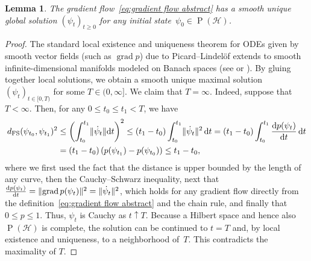 \documentclass[11pt,a4paper]{article}
\newtheorem{lemma}[theorem]{Lemma}\AddToHook{env/lemma/begin}{\crefalias{theorem}{lemma}}
\numberwithin{equation}{section}
\newcommand{\dd}{\textrm{d}}
\newcommand{\HH}{\mathcal{H}}
\newcommand{\1}{\mathbf{1}}
\let\oldS\S
\renewcommand{\S}{\operatorname{S}}
\renewcommand{\P}{\operatorname{P}}
\DeclareMathOperator{\grad}{grad}
\DeclarePairedDelimiter\norm{\lVert}{\rVert}
\begin{document}
\begin{lemma}\label{lem:ode}
The gradient flow~\eqref{eq:gradient flow abstract} has a smooth unique global solution $(\psi_t)_{t\geq0}$ for any initial state~$\psi_0 \in \P(\HH)$.
\end{lemma}
\begin{proof}
The standard local existence and uniqueness theorem for ODEs given by smooth vector fields (such as $\grad p$) due to Picard--Lindel\"of extends to smooth infinite-dimensional manifolds modeled on Banach spaces (see \cite[\oldS{}1.10]{moore2017introduction} or \cite[\oldS{}IV]{lang2012fundamentals}).
By gluing together local solutions, we obtain a smooth unique maximal solution $(\psi_t)_{t\in[0,T)}$ for some $T \in (0,\infty]$.
We claim that $T = \infty$.
Indeed, suppose that $T<\infty$.
Then, for any $0 \leq t_0 \leq t_1 < T$, we have
\begin{align*}
    d_{\mathrm{FS}}(\psi_{t_0}, \psi_{t_1})^2
&\leq \left( \int_{t_0}^{t_1} \norm{\dot\psi_t} \dd t \right)^2
\leq (t_1 - t_0) \int_{t_0}^{t_1} \norm{\dot\psi_t}^2 \, \dd t
= (t_1 - t_0) \int_{t_0}^{t_1} \frac{\dd p(\psi_t)}{\dd t} \, \dd t \\
&= (t_1 - t_0) \left( p(\psi_{t_1}) - p(\psi_{t_0}) \right)
\leq t_1 - t_0,
\end{align*}
where we first used the fact that the distance is upper bounded by the length of any curve, then the Cauchy--Schwarz inequality,
next that $\frac{\dd p(\psi_t)}{\dd t} = \norm{\grad p(\psi_t)}^2 = \norm{\dot\psi_t}^2$, which holds for any gradient flow directly from the definition~\eqref{eq:gradient flow abstract} and the chain rule, and finally that $0 \leq p \leq 1$.
Thus, $\psi_t$ is Cauchy as $t\uparrow T$.
Because a Hilbert space and hence also~$\P(\HH)$ is complete, the solution can be continued to $t=T$ and, by local existence and uniqueness, to a neighborhood of~$T$.
This contradicts the maximality of $T$.
\end{proof}
\end{document}

